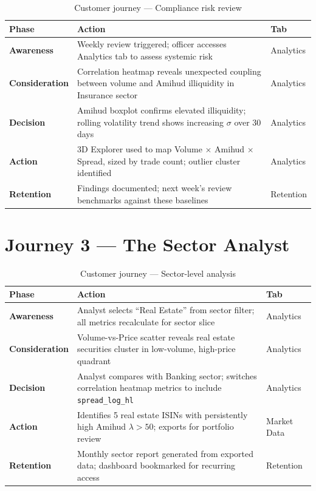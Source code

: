 \documentclass[
  11pt,
  a4paper,
  twoside,
  openany
]{report}
\begin{document}
\begin{table}[H]
\centering
\caption{Customer journey — Compliance risk review}
\label{tab:journey-compliance}
\small
\begin{tabularx}{\textwidth}{>{\bfseries}l X l}
\toprule
\textbf{Phase} & \textbf{Action} & \textbf{Tab} \\
\midrule
Awareness     & Weekly review triggered; officer accesses Analytics tab to assess systemic risk & Analytics \\
Consideration & Correlation heatmap reveals unexpected coupling between volume and Amihud illiquidity in Insurance sector & Analytics \\
Decision      & Amihud boxplot confirms elevated illiquidity; rolling volatility trend shows increasing $\sigma$ over 30 days & Analytics \\
Action        & 3D Explorer used to map Volume $\times$ Amihud $\times$ Spread, sized by trade count; outlier cluster identified & Analytics \\
Retention     & Findings documented; next week's review benchmarks against these baselines & Retention \\
\bottomrule
\end{tabularx}
\end{table}

\section{Journey 3 — The Sector Analyst}

\begin{table}[H]
\centering
\caption{Customer journey — Sector-level analysis}
\label{tab:journey-analyst}
\small
\begin{tabularx}{\textwidth}{>{\bfseries}l X l}
\toprule
\textbf{Phase} & \textbf{Action} & \textbf{Tab} \\
\midrule
Awareness     & Analyst selects ``Real Estate'' from sector filter; all metrics recalculate for sector slice & Analytics \\
Consideration & Volume-vs-Price scatter reveals real estate securities cluster in low-volume, high-price quadrant & Analytics \\
Decision      & Analyst compares with Banking sector; switches correlation heatmap metrics to include \texttt{spread\_log\_hl} & Analytics \\
Action        & Identifies 5 real estate ISINs with persistently high Amihud $\lambda > 50$; exports for portfolio review & Market Data \\
Retention     & Monthly sector report generated from exported data; dashboard bookmarked for recurring access & Retention \\
\bottomrule
\end{tabularx}
\end{table}
\end{document}
